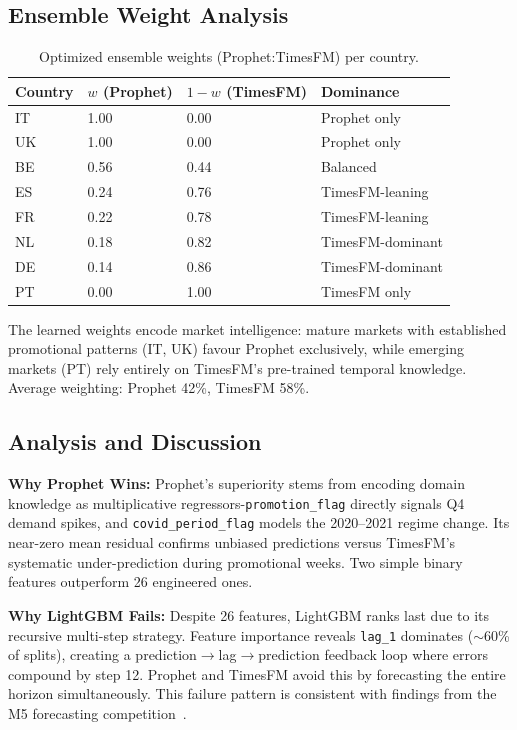 \documentclass[11pt,a4paper]{article}
\begin{document}
\subsection{Ensemble Weight Analysis}

\begin{table}[H]
\caption{Optimized ensemble weights (Prophet:TimesFM) per country.}
\setlength{\tabcolsep}{16pt}
\renewcommand{\arraystretch}{1.4}
\begin{tabular}{l l l l}
\toprule
\textbf{Country} & \textbf{$w$ (Prophet)} & \textbf{$1\!-\!w$ (TimesFM)} & \textbf{Dominance} \\
\midrule
IT & 1.00 & 0.00 & Prophet only \\
UK & 1.00 & 0.00 & Prophet only \\
BE & 0.56 & 0.44 & Balanced \\
ES & 0.24 & 0.76 & TimesFM-leaning \\
FR & 0.22 & 0.78 & TimesFM-leaning \\
NL & 0.18 & 0.82 & TimesFM-dominant \\
DE & 0.14 & 0.86 & TimesFM-dominant \\
PT & 0.00 & 1.00 & TimesFM only \\
\bottomrule
\end{tabular}
\end{table}

The learned weights encode market intelligence: mature markets with established promotional patterns (IT, UK) favour Prophet exclusively, while emerging markets (PT) rely entirely on TimesFM's pre-trained temporal knowledge. Average weighting: Prophet 42\%, TimesFM 58\%.

\subsection{Analysis and Discussion}

\textbf{Why Prophet Wins:} Prophet's superiority stems from encoding domain knowledge as multiplicative regressors-\texttt{promotion\_flag} directly signals Q4 demand spikes, and \texttt{covid\_period\_flag} models the 2020--2021 regime change. Its near-zero mean residual confirms unbiased predictions versus TimesFM's systematic under-prediction during promotional weeks. Two simple binary features outperform 26 engineered ones.

\textbf{Why LightGBM Fails:} Despite 26 features, LightGBM ranks last due to its recursive multi-step strategy. Feature importance reveals \texttt{lag\_1} dominates ($\sim$60\% of splits), creating a prediction$\rightarrow$lag$\rightarrow$prediction feedback loop where errors compound by step 12. Prophet and TimesFM avoid this by forecasting the entire horizon simultaneously. This failure pattern is consistent with findings from the M5 forecasting competition~\cite{makridakis2020m5}.
\end{document}
